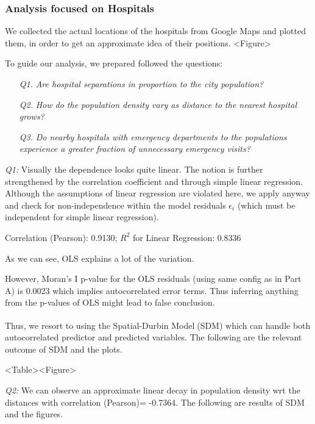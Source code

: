 \documentclass[
	a4paper, %
	10pt, %
	unnumberedsections, %
	twoside, %
]{LTJournalArticle}
\begin{document}
\subsubsection{Analysis focused on Hospitals}

We collected the actual locations of the hospitals from Google Maps and plotted them, in order to get an approximate idea of their positions. <Figure>

To guide our analysis, we prepared followed the questions:
\begin{enumerate}
  \item[\textit{Q1.}] \textit{Are hospital separations in proportion to the city population?}
  \item[\textit{Q2.}] \textit{How do the population density vary as distance to the nearest hospital grows?}
  \item[\textit{Q3.}] \textit{Do nearby hospitals with emergency departments to the populations experience a greater fraction of unnecessary emergency visits?}
\end{enumerate}


\textit{Q1:} Visually the dependence looks quite linear. The notion is further strengthened by the correlation coefficient and through simple linear regression. Although the assumptions of linear regression are violated here, we apply anyway and check for non-independence within the model residuals $\epsilon_i$ (which must be independent for simple linear regression). 

Correlation (Pearson): 0.9130; $R^2$ for Linear Regression: 0.8336

As we can see, OLS explains a lot of the variation. 

However, Moran's I p-value for the OLS residuals (using same config as in Part A) is 0.0023 which implies autocorrelated error terms. Thus inferring anything from the p-values of OLS might lead to false conclusion.

Thus, we resort to using the Spatial-Durbin Model\textsuperscript{\cite{atikah2021efficiency} \cite{Anselin1988} \cite{doi:10.1080/17421770601009841}} (SDM) which can handle both autocorrelated predictor and predicted variables. The following are the relevant outcome of SDM and the plots.

<Table><Figure>

\textit{Q2:} We can observe an approximate linear decay in population density wrt the distances with correlation (Pearson)= -0.7364. The following are results of SDM and the figures.
\end{document}
